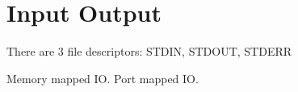 \section{Input Output}

There are 3 file descriptors: STDIN, STDOUT, STDERR

Memory mapped IO. Port mapped IO. 

